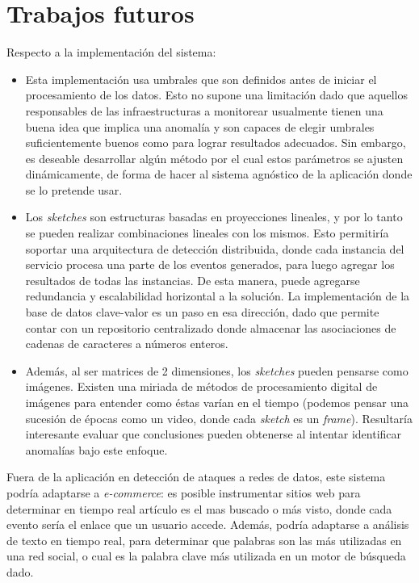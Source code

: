 \documentclass[a4paper,10pt, oneside]{article}
\begin{document}
\section{Trabajos futuros}
Respecto a la implementación del sistema:
\begin{itemize}
	\item Esta implementación usa umbrales que son definidos antes de iniciar el procesamiento de los datos. Esto no supone una limitación dado que aquellos responsables de las infraestructuras a monitorear usualmente tienen una buena idea que implica una anomalía y son capaces de elegir umbrales suficientemente buenos como para lograr resultados adecuados. Sin embargo, es deseable desarrollar algún método por el cual estos parámetros se ajusten dinámicamente, de forma de hacer al sistema agnóstico de la aplicación donde se lo pretende usar.
	\item Los \textit{sketches} son estructuras basadas en proyecciones lineales, y por lo tanto se pueden realizar combinaciones lineales con los mismos. Esto permitiría soportar una arquitectura de detección distribuida, donde cada instancia del servicio procesa una parte de los eventos generados, para luego agregar los resultados de todas las instancias. De esta manera, puede agregarse redundancia y escalabilidad horizontal a la solución. La implementación de la base de datos clave-valor es un paso en esa dirección, dado que permite contar con un repositorio centralizado donde almacenar las asociaciones de cadenas de caracteres a números enteros.
	\item Además, al ser matrices de 2 dimensiones, los \textit{sketches} pueden pensarse como imágenes. Existen una miriada de métodos de procesamiento digital de imágenes para entender como éstas varían en el tiempo (podemos pensar una sucesión de épocas como un video, donde cada \textit{sketch} es un \textit{frame}). Resultaría interesante evaluar que conclusiones pueden obtenerse al intentar identificar anomalías bajo este enfoque.
\end{itemize}

Fuera de la aplicación en detección de ataques a redes de datos, este sistema podría adaptarse a \textit{e-commerce}: es posible instrumentar sitios web para determinar en tiempo real artículo es el mas buscado o más visto, donde cada evento sería el enlace que un usuario accede. Además, podría adaptarse a análisis de texto en tiempo real, para determinar que palabras son las más utilizadas en una red social, o cual es la palabra clave más utilizada en un motor de búsqueda dado.
\end{document}

